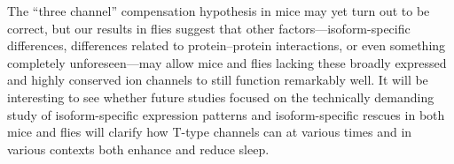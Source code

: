 The ``three channel'' compensation hypothesis in mice may yet turn out to be correct, but our results in flies suggest that other factors---isoform-specific differences, differences related to protein--protein interactions, or even something completely unforeseen---may allow mice and flies lacking these broadly expressed and highly conserved ion channels to still function remarkably well.
It will be interesting to see whether future studies focused on the technically demanding study of isoform-specific expression patterns and isoform-specific rescues in both mice and flies will clarify how T-type channels can at various times and in various contexts both enhance and reduce sleep.
